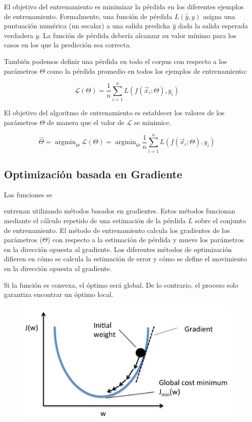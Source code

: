 El objetivo del entrenamiento es minimizar la pérdida en los diferentes ejemplos de entrenamiento. Formalmente, una función de pérdida $L(\hat{y},y)$ asigna una puntuación numérica (un escalar) a una salida predicha $\hat{y}$ dada la salida esperada verdadera $y$. La función de pérdida debería alcanzar su valor mínimo para los casos en los que la predicción sea correcta.

También podemos definir una pérdida en todo el corpus con respecto a los parámetros $\Theta$ como la pérdida promedio en todos los ejemplos de entrenamiento:

\begin{displaymath}
 \mathcal{L}(\Theta) = \frac{1}{n} \sum_{i=1}^n L(f(\vec{x}_i;\Theta), y_i)
\end{displaymath}

El objetivo del algoritmo de entrenamiento es establecer los valores de los parámetros $\Theta$ de manera que el valor de $\mathcal{L}$ se minimice.

\begin{displaymath}
 \hat{\Theta} = \operatorname{argmin}_{\Theta} \mathcal{L}(\Theta) =  \operatorname{argmin}_{\Theta} \frac{1}{n} \sum_{i=1}^n L(f(\vec{x}_i;\Theta), y_i)
\end{displaymath}

\subsection{Optimización basada en Gradiente}
Las funciones se

entrenan utilizando métodos basados en gradientes. Estos métodos funcionan mediante el cálculo repetido de una estimación de la pérdida $L$ sobre el conjunto de entrenamiento. El método de entrenamiento calcula los gradientes de los parámetros ($\Theta$) con respecto a la estimación de pérdida y mueve los parámetros en la dirección opuesta al gradiente. Los diferentes métodos de optimización difieren en cómo se calcula la estimación de error y cómo se define el movimiento en la dirección opuesta al gradiente.

Si la función es convexa, el óptimo será global. De lo contrario, el proceso solo garantiza encontrar un óptimo local.

\begin{figure}[htb]
	\centering
	 \includegraphics[scale=0.15]{pics/sgd.png}
\end{figure}

